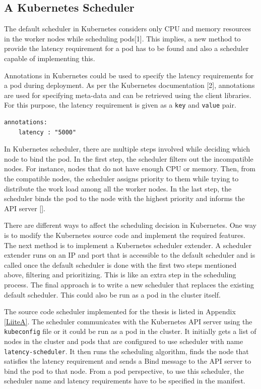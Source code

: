 \documentclass[english, 12pt, a4paper, elec, utf8, a-1b, online]{aaltothesis}
\begin{document}
\subsection{A Kubernetes Scheduler}
The default scheduler in Kubernetes considers only CPU and memory resources in the worker nodes while scheduling pods[1]. This implies, a new method to provide the latency requirement for a pod has to be found and also a scheduler capable of implementing this.

Annotations in Kubernetes could be used to specify the latency requirements for a pod during deployment. As per the Kubernetes documentation [2], annotations are used for specifying meta-data and can be retrieved using the client libraries. For this purpose, the latency requirement is given as a \lstinline{key} and \lstinline{value} pair.
\begin{lstlisting}[basicstyle={\small\ttfamily}]
  annotations:
    latency : "5000"
\end{lstlisting}

In Kubernetes scheduler, there are multiple steps involved while deciding which node to bind the pod. In the first step, the scheduler filters out the incompatible nodes. For instance, nodes that do not have enough CPU or memory. Then, from the compatible nodes, the scheduler assigns priority to them while trying to distribute the work load among all the worker nodes. In the last step, the scheduler binds the pod to the node with the highest priority and informs the API server [].

There are different ways to affect the scheduling decision in Kubernetes. One way is to modify the Kubernetes source code and implement the required features. The next method is to implement a Kubernetes scheduler extender. A scheduler extender runs on an IP and port that is accessible to the default scheduler and is called once the default scheduler is done with the first two steps mentioned above, filtering and prioritizing. This is like an extra step in the scheduling process. The final approach is to write a new scheduler that replaces the existing default scheduler. This could also be run as a pod in the cluster itself.

The source code scheduler implemented for the thesis is listed in Appendix \ref{LiiteA}. The scheduler communicates with the Kubernetes API server using the \lstinline{kubeconfig} file or it could be run as a pod in the cluster. It initially gets a list of nodes in the cluster and pods that are configured to use scheduler with name \lstinline{latency-scheduler}. It then runs the scheduling algorithm, finds the node that satisfies the latency requirement and sends a Bind message to the API server to bind the pod to that node. From a pod perspective, to use this scheduler, the scheduler name and latency requirements have to be specified in the manifest.
\end{document}
